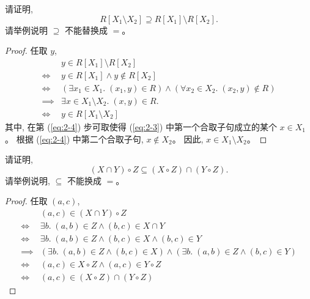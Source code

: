 \documentclass[a4paper, justified]{tufte-handout}
\begin{document}
\begin{problem}
  请证明,
  \[
    R[X_1 \setminus X_2] \supseteq R[X_1] \setminus R[X_2].
  \]
  请举例说明 $\supseteq$ 不能替换成 $=$。
\end{problem}

\begin{proof}
  任取 $y$,
  \setcounter{equation}{0}
  \begin{align}
    & y \in R[X_{1}] \setminus R[X_{2}] \\[6pt]
    \iff & y \in R[X_{1}] \land y \notin R[X_{2}] \\[6pt]
    \iff & (\exists x_{1} \in X_{1}.\; (x_{1}, y) \in R)
      \land (\forall x_{2} \in X_{2}.\; (x_{2}, y) \notin R)
      \label{eq:2-3} \\[6pt]
    \implies & \exists x \in X_{1} \setminus X_{2}.\; (x, y) \in R. \\[6pt]
      \label{eq:2-4}
    \iff & y \in R[X_{1} \setminus X_{2}]
  \end{align}
  其中, 在第 (\ref{eq:2-4}) 步可取使得 (\ref{eq:2-3})
  中第一个合取子句成立的某个 $x \in X_{1}$。
  根据 (\ref{eq:2-4}) 中第二个合取子句, $x \notin X_{2}$。
  因此, $x \in X_{1} \setminus X_{2}$。

\end{proof}

\begin{problem}
  请证明,
  \[
    (X \cap Y) \circ Z \subseteq (X \circ Z) \cap (Y \circ Z).
  \]
  请举例说明, $\subseteq$ 不能换成 $=$。
\end{problem}

\begin{proof}
  任取 $(a, c)$,
  \setcounter{equation}{0}
  \begin{align}
    & (a, c) \in (X \cap Y) \circ Z \\[6pt]
    \iff & \exists b.\; (a, b) \in Z \land (b, c) \in X \cap Y \\[6pt]
    \iff & \exists b.\; (a, b) \in Z \land (b, c) \in X \land (b, c) \in Y \\[6pt]
    \implies & (\exists b.\; (a, b) \in Z \land (b, c) \in X)
      \land (\exists b.\; (a, b) \in Z \land (b, c) \in Y) \\[6pt]
    \iff & (a, c) \in X \circ Z \land (a, c) \in Y \circ Z \\[6pt]
    \iff & (a, c) \in (X \circ Z) \cap (Y \circ Z)
  \end{align}

\end{proof}
\end{document}
